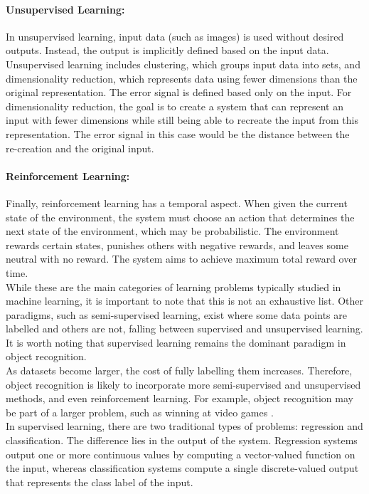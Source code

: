 \paragraph{Unsupervised Learning:} In unsupervised learning, input data (such as images) is used without desired outputs. Instead, the output is implicitly defined based on the input data. Unsupervised learning includes clustering, which groups input data into sets, and dimensionality reduction, which represents data using fewer dimensions than the original representation. The error signal is defined based only on the input. For dimensionality reduction, the goal is to create a system that can represent an input with fewer dimensions while still being able to recreate the input from this representation. The error signal in this case would be the distance between the re-creation and the original input. 

\paragraph{Reinforcement Learning:} Finally, reinforcement learning has a temporal aspect. When given the current state of the environment, the system must choose an action that determines the next state of the environment, which may be probabilistic. The environment rewards certain states, punishes others with negative rewards, and leaves some neutral with no reward. The system aims to achieve maximum total reward over time. \\

\noindent While these are the main categories of learning problems typically studied in machine learning, it is important to note that this is not an exhaustive list. Other paradigms, such as semi-supervised learning, exist where some data points are labelled and others are not, falling between supervised and unsupervised learning. It is worth noting that supervised learning remains the dominant paradigm in object recognition. \\

\noindent As datasets become larger, the cost of fully labelling them increases. Therefore, object recognition is likely to incorporate more semi-supervised and unsupervised methods, and even reinforcement learning. For example, object recognition may be part of a larger problem, such as winning at video games \cite{mnih2013playing}. \\

\noindent In supervised learning, there are two traditional types of problems: regression and classification. The difference lies in the output of the system. Regression systems output one or more continuous values by computing a vector-valued function on the input, whereas classification systems compute a single discrete-valued output that represents the class label of the input. \\

